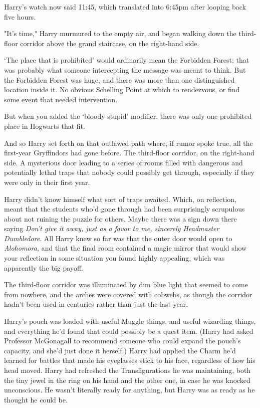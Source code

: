 Harry's watch now said 11:45, which translated into 6:45pm after looping back 
five hours.

"It's time," Harry murmured to the empty air, and began walking down the 
third-floor corridor above the grand staircase, on the right-hand side.

`The place that is prohibited' would ordinarily mean the Forbidden Forest; that 
was probably what someone intercepting the message was meant to think. But the 
Forbidden Forest was huge, and there was more than one distinguished location 
inside it. No obvious Schelling Point at which to rendezvous, or find some 
event that needed intervention.

But when you added the `bloody stupid' modifier, there was only one prohibited 
place in Hogwarts that fit.

And so Harry set forth on that outlawed path where, if rumor spoke true, all 
the first-year Gryffindors had gone before. The third-floor corridor, on the 
right-hand side. A mysterious door leading to a series of rooms filled with 
dangerous and potentially lethal traps that nobody could possibly get through, 
especially if they were only in their first year.

Harry didn't know himself what sort of traps awaited. Which, on reflection, 
meant that the students who'd gone through had been surprisingly scrupulous 
about not ruining the puzzle for others. Maybe there was a sign down there 
saying \emph{Don't give it away, just as a favor to me, sincerely Headmaster 
Dumbledore}. All Harry knew so far was that the outer door would open to 
\emph{Alohomora,} and that the final room contained a magic mirror that would 
show your reflection in some situation you found highly appealing, which was 
apparently the big payoff.

The third-floor corridor was illuminated by dim blue light that seemed to come 
from nowhere, and the arches were covered with cobwebs, as though the corridor 
hadn't been used in centuries rather than just the last year.

Harry's pouch was loaded with useful Muggle things, and useful wizarding 
things, and everything he'd found that could possibly be a quest item. (Harry 
had asked Professor McGonagall to recommend someone who could expand the 
pouch's capacity, and she'd just done it herself.) Harry had applied the Charm 
he'd learned for battles that made his eyeglasses stick to his face, regardless 
of how his head moved. Harry had refreshed the Transfigurations he was 
maintaining, both the tiny jewel in the ring on his hand and the other one, in 
case he was knocked unconscious. He wasn't literally ready for anything, but 
Harry was as ready as he thought he could be.

